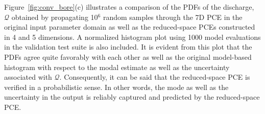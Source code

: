 Figure~\ref{fig:conv_bore}(c) illustrates a comparison of the PDFs
of the
discharge, $\mathcal{Q}$ obtained by propagating 10$^6$ random
samples through the 7D PCE in the original input parameter domain as well as
the reduced-space PCEs constructed in 4 and 5 dimensions. A normalized histogram
plot using 1000 model evaluations in the validation test suite is also included.
It is evident from this plot that the PDFs agree quite favorably with each
other as well as the original model-based histogram with respect to the modal estimate
as well as the uncertainty associated with $\mathcal{Q}$. 
Consequently, it can be said that the reduced-space PCE is verified in a
probabilistic sense. In other words, the mode as well as the uncertainty in the
output is reliably captured and predicted by the reduced-space PCE. 
% 
%
